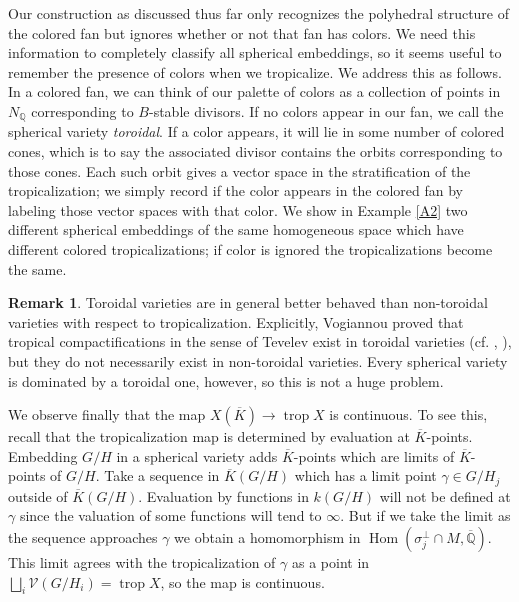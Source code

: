 \documentclass[12pt,twoside,cd]{amsart}
\theoremstyle{definition}
\newtheorem{remark}[theorem]{Remark}
\begin{document}
Our construction as discussed thus far only recognizes the polyhedral structure of the colored fan but ignores whether or not that fan has colors.
We need this information to completely classify all spherical embeddings, so it seems useful to remember the presence of colors when we tropicalize.
We address this as follows.
In a colored fan, we can think of our palette of colors as a collection of points in $N_\mathbb{Q}$ corresponding to $B$-stable divisors.
If no colors appear in our fan, we call the spherical variety \emph{toroidal}.
If a color appears, it will lie in some number of colored cones, which is to say the associated divisor contains the orbits corresponding to those cones.
Each such orbit gives a vector space in the stratification of the tropicalization; we simply record if the color appears in the colored fan by labeling those vector spaces with that color.
We show in Example \ref{A2} two different spherical embeddings of the same homogeneous space which have different colored tropicalizations; if color is ignored the tropicalizations become the same.

\begin{remark}\label{remark} 
Toroidal varieties are in general better behaved than non-toroidal varieties with respect to tropicalization. Explicitly, Vogiannou proved that tropical compactifications in the sense of Tevelev \cite{Te} exist in toroidal varieties (cf. \cite{Vo}, ), but they do not necessarily exist in non-toroidal varieties.
Every spherical variety is dominated by a toroidal one, however, so this is not a huge problem. 
\end{remark}

We observe finally that the map $X(\overline{K}) \rightarrow {\operatorname{trop}}{X}$ is continuous.
To see this, recall that the tropicalization map is determined by evaluation at $\overline{K}$-points.
Embedding $G/H$ in a spherical variety adds $\overline{K}$-points which are limits of $\overline{K}$-points of $G/H$.
Take a sequence in $\overline{K}(G/H)$ which has a limit point $\gamma \in G/H_j$ outside of $\overline{K}(G/H)$.
Evaluation by functions in $k(G/H)$ will not be defined at $\gamma$ since the valuation of some functions will tend to $\infty$.
But if we take the limit as the sequence approaches $\gamma$ we obtain a homomorphism in ${\operatorname{Hom}}{(\sigma_j^\perp \cap M, \overline{\mathbb{Q}})}$.
This limit agrees with the tropicalization of $\gamma$ as a point in $\bigsqcup_i \mathcal{V}(G/H_i) = {\operatorname{trop}}{X}$, so the map is continuous.
\end{document}

